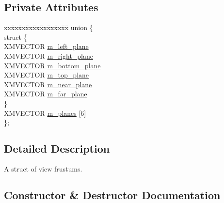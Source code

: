 \subsection*{Private Attributes}
\begin{DoxyCompactItemize}
\item 
\begin{tabbing}
xx\=xx\=xx\=xx\=xx\=xx\=xx\=xx\=xx\=\kill
union \{\\
\>struct \{\\
\>\>XMVECTOR \hyperlink{structmage_1_1_view_frustum_a07375137f59a785cf123c9feca08d393}{m\_left\_plane}\\
\>\>XMVECTOR \hyperlink{structmage_1_1_view_frustum_a95718f7a8fdd743872b93904e99b4268}{m\_right\_plane}\\
\>\>XMVECTOR \hyperlink{structmage_1_1_view_frustum_a66ea2332f1c30b7a1d3ba8f0f0fed347}{m\_bottom\_plane}\\
\>\>XMVECTOR \hyperlink{structmage_1_1_view_frustum_a82076a48eaa7ed305a0a1c43246f93d4}{m\_top\_plane}\\
\>\>XMVECTOR \hyperlink{structmage_1_1_view_frustum_a3f8e1216b85b0f19839229c9cc9d97fb}{m\_near\_plane}\\
\>\>XMVECTOR \hyperlink{structmage_1_1_view_frustum_a02e8a940302c6c2a0d489f0fe35e7f19}{m\_far\_plane}\\
\>\} \\
\>XMVECTOR \hyperlink{structmage_1_1_view_frustum_a671ec972dbd87a714cfd114a57d47949}{m\_planes} \mbox{[}6\mbox{]}\\
\}; \\

\end{tabbing}\end{DoxyCompactItemize}


\subsection{Detailed Description}
A struct of view frustums. 

\subsection{Constructor \& Destructor Documentation}
\hypertarget{structmage_1_1_view_frustum_a8c3f1791977a5b53b81b544fc6748622}{}\label{structmage_1_1_view_frustum_a8c3f1791977a5b53b81b544fc6748622} 

